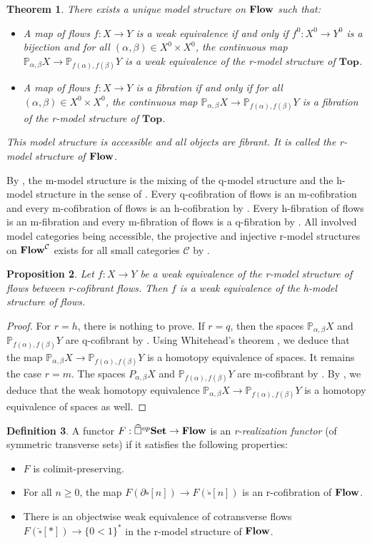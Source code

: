 \documentclass[a4paper,12pt]{amsart}
\newcommand{\C}{\mathcal{C}}
\newcommand{\de}{\partial}
\newcommand{\p}{\times}
\newtheorem{thm}{Theorem}[section]
\newtheorem{prop}[thm]{Proposition}
\newcommand{\bp}{\begin{prop}}
\newcommand{\ep}{\end{prop}}
\newcommand{\bth}{\begin{thm}}
\renewcommand{\eth}{\end{thm}}
\newcommand{\bpf}{\begin{proof}}
\newcommand{\epf}{\end{proof}}
\theoremstyle{definition}
\newtheorem{defn}[thm]{Definition}
\newcommand{\bd}{\begin{defn}}
\newcommand{\ed}{\end{defn}}
\renewcommand{\top}{{\mathbf{Top}}}
\renewcommand{\geq}{\geqslant}
\newcommand{\brm}[1]{{\rm{\mathbf{#1}}}}
\newcommand{\dtop}{{\brm{Flow}}}
\newcommand{\set}{{\brm{Set}}}
\renewcommand{\P}{\mathbb{P}}
\begin{document}
\bth \label{three} \cite[Theorem~7.4]{QHMmodel} There exists a unique model structure on $\dtop$ such that: 
\begin{itemize}
	\item A map of flows $f:X\to Y$ is a weak equivalence if and only if $f^0:X^0\to Y^0$ is a bijection and for all $(\alpha,\beta)\in X^0\p X^0$, the continuous map $\P_{\alpha,\beta}X\to \P_{f(\alpha),f(\beta)}Y$ is a weak equivalence of the r-model structure of $\top$.
	\item A map of flows $f:X\to Y$ is a fibration if and only if for all $(\alpha,\beta)\in X^0\p X^0$, the continuous map $\P_{\alpha,\beta}X\to \P_{f(\alpha),f(\beta)}Y$ is a fibration of the r-model structure of $\top$.
\end{itemize}
This model structure is accessible and all objects are fibrant. It is called the r-model structure of $\dtop$.
\eth

By \cite[Theorem~7.7]{QHMmodel}, the m-model structure is the mixing of the q-model structure and the h-model structure in the sense of \cite[Theorem~2.1]{mixed-cole}. Every q-cofibration of flows is an m-cofibration and every m-cofibration of flows is an h-cofibration by \cite[Proposition~3.6]{mixed-cole}. Every h-fibration of flows is an m-fibration and every m-fibration of flows is a q-fibration by \cite[Theorem~2.1]{mixed-cole}. All involved model categories being accessible, the projective and injective r-model structures on $\dtop^\C$ exists for all small categories $\C$ by \cite[Theorem~3.4.1]{HKRS17}.

\bp \label{r-homotopy-r-cofibrant}
Let $f:X\to Y$ be a weak equivalence of the r-model structure of flows between r-cofibrant flows. Then $f$ is a weak equivalence of the h-model structure of flows.
\ep

\bpf
For $r=h$, there is nothing to prove. If $r=q$, then the spaces $\P_{\alpha,\beta}X$ and $\P_{f(\alpha),f(\beta)}Y$ are q-cofibrant by \cite[Theorem~5.7]{leftproperflow}. Using Whitehead's theorem \cite[Theorem~7.5.10, p.~124]{ref_model2}, we deduce that the map $\P_{\alpha,\beta}X\to \P_{f(\alpha),f(\beta)}Y$ is a homotopy equivalence of spaces. It remains the case $r=m$. The spaces $P_{\alpha,\beta}X$ and $\P_{f(\alpha),f(\beta)}Y$ are m-cofibrant by \cite[Theorem~8.7]{QHMmodel}. By \cite[Corollary~3.4]{mixed-cole}, we deduce that the weak homotopy equivalence $\P_{\alpha,\beta}X\to \P_{f(\alpha),f(\beta)}Y$ is a homotopy equivalence of spaces as well.
\epf

\bd \label{def-rea-flow} A functor $F:\widehat{\square}^{op}\set \to \dtop$ is an \textit{r-realization functor} (of symmetric transverse sets) if it satisfies the following properties:
\begin{itemize}
	\item $F$ is colimit-preserving.
	\item For all $n\geq 0$, the map $F(\de\widehat{\square}[n])\to F(\widehat{\square}[n])$ is an r-cofibration of $\dtop$.
	\item There is an objectwise weak equivalence of cotransverse flows $F(\widehat{\square}[*])\to \{0<1\}^*$ in the r-model structure of $\dtop$.
\end{itemize}
\ed
\end{document}
